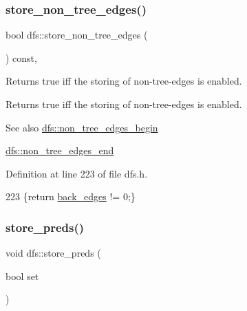 \subsubsection{\texorpdfstring{store\+\_\+non\+\_\+tree\+\_\+edges()}{store\_non\_tree\_edges()}\hspace{0.1cm}{\footnotesize\ttfamily [2/2]}}
{\footnotesize\ttfamily bool dfs\+::store\+\_\+non\+\_\+tree\+\_\+edges (\begin{DoxyParamCaption}{ }\end{DoxyParamCaption}) const\hspace{0.3cm}{\ttfamily [inline]}, {\ttfamily [inherited]}}



Returns true iff the storing of non-\/tree-\/edges is enabled. 

\begin{DoxyReturn}{Returns}
true iff the storing of non-\/tree-\/edges is enabled. 
\end{DoxyReturn}
\begin{DoxySeeAlso}{See also}
\mbox{\hyperlink{classdfs_a4efe5bb72d00305e6b226e67c2b2ef6e}{dfs\+::non\+\_\+tree\+\_\+edges\+\_\+begin}} 

\mbox{\hyperlink{classdfs_ad9cd92a18bda23edca8ab3ac60a15ef4}{dfs\+::non\+\_\+tree\+\_\+edges\+\_\+end}} 
\end{DoxySeeAlso}


Definition at line 223 of file dfs.\+h.


\begin{DoxyCode}
223 \{\textcolor{keywordflow}{return} \mbox{\hyperlink{classdfs_a1dc18a7df8d6b238d5301c92fc7540fa}{back\_edges}} != 0;\}
\end{DoxyCode}
\mbox{\label{classdfs_a7043f46eb3887cbcbb1391fc783407a4}} 
\subsubsection{\texorpdfstring{store\+\_\+preds()}{store\_preds()}\hspace{0.1cm}{\footnotesize\ttfamily [1/2]}}
{\footnotesize\ttfamily void dfs\+::store\+\_\+preds (\begin{DoxyParamCaption}\item[{bool}]{set }\end{DoxyParamCaption})\hspace{0.3cm}{\ttfamily [inherited]}}



